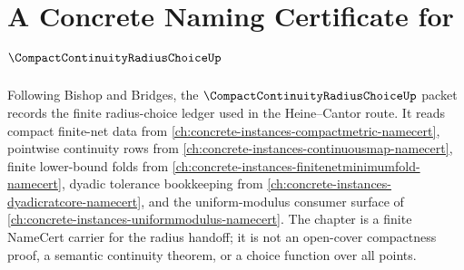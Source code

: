 \chapter{A Concrete Naming Certificate for $\CompactContinuityRadiusChoiceUp$}
\label{ch:concrete-instances-compact-continuity-radius-choice-namecert}

Following Bishop and Bridges, the $\CompactContinuityRadiusChoiceUp$ packet records the finite radius-choice ledger used in the Heine--Cantor route. It reads compact finite-net data from \autoref{ch:concrete-instances-compactmetric-namecert}, pointwise continuity rows from \autoref{ch:concrete-instances-continuousmap-namecert}, finite lower-bound folds from \autoref{ch:concrete-instances-finitenetminimumfold-namecert}, dyadic tolerance bookkeeping from \autoref{ch:concrete-instances-dyadicratcore-namecert}, and the uniform-modulus consumer surface of \autoref{ch:concrete-instances-uniformmodulus-namecert}. The chapter is a finite NameCert carrier for the radius handoff; it is not an open-cover compactness proof, a semantic continuity theorem, or a choice function over all points.


